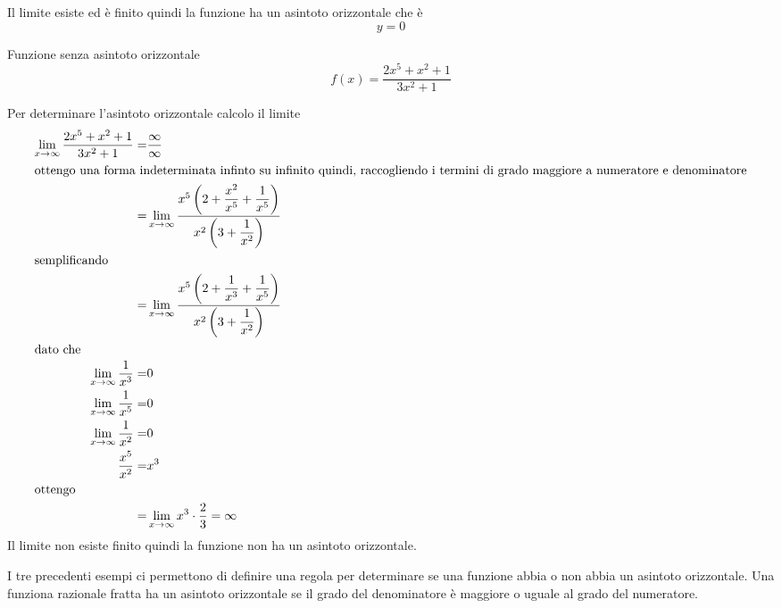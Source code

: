 Il limite esiste ed è finito quindi la funzione ha un asintoto orizzontale che è \[y=0\]
\begin{cesempiot}{Funzione senza asintoto orizzontale}{}
	\[f(x)=\dfrac{2x^5+x^2+1}{3x^2+1}\]
\end{cesempiot}
Per determinare l'asintoto orizzontale calcolo il limite 
\begin{align*}\index{Forma!indeterminata!infinito su infinito}
\lim_{x\to \infty}\dfrac{2x^5+x^2+1}{3x^2+1}=&\dfrac{\infty}{\infty}\\
\intertext{ottengo una forma indeterminata infinto su infinito quindi, raccogliendo i termini di grado maggiore a numeratore e denominatore}
=&\lim_{x\to \infty}\dfrac{x^5\left(2+\dfrac{x^2}{x^5}+\dfrac{1}{x^5}\right)}{x^2\left(3+\dfrac{1}{x^2}\right)}\\
\intertext{semplificando}
=&\lim_{x\to \infty}\dfrac{x^5\left(2+\dfrac{1}{x^3}+\dfrac{1}{x^5}\right)}{x^2\left(3+\dfrac{1}{x^2}\right)}\\
\intertext{dato che}
\lim_{x\to \infty}\dfrac{1}{x^3}=&0\\
\lim_{x\to \infty}\dfrac{1}{x^5}=&0\\
\lim_{x\to \infty}\dfrac{1}{x^2}=&0\\
\dfrac{x^5}{x^2}=&x^3\\
\intertext{ottengo}
=&\lim_{x\to \infty}x^3\cdot\dfrac{2}{3}=\infty\\
\end{align*}
Il limite non esiste  finito quindi la funzione non ha un asintoto orizzontale.

I tre precedenti esempi ci permettono di definire una regola per determinare se una funzione abbia o non abbia un asintoto orizzontale. Una funziona razionale fratta ha un asintoto orizzontale se il grado del denominatore è maggiore o uguale al grado del numeratore. 
